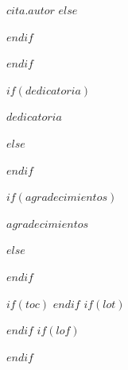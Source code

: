 \hfill {$cita.autor$}
$else$

$endif$

$endif$
\newpage


$if(dedicatoria)$

\thispagestyle{empty}

\vspace*{0.3\textheight}

{$dedicatoria$}

$else$


$endif$
\newpage



$if(agradecimientos)$
\thispagestyle{empty}


$agradecimientos$

$else$


$endif$
\newpage

$if(toc)$
\tableofcontents
$endif$
$if(lot)$
\listoftables
$endif$
$if(lof)$
\listoffigures
$endif$